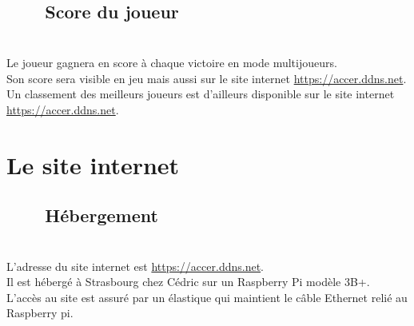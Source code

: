 \documentclass[titlepage, 13px, a4paper]{report}
\begin{document}
\subsection[Score du joueur]{~~~~Score du joueur}
\paragraph*{} \hspace{0pt} \\
Le joueur gagnera en score à chaque victoire en mode multijoueurs. \\
Son score sera visible en jeu mais aussi sur le site internet \url{https://accer.ddns.net}. \\
Un classement des meilleurs joueurs est d’ailleurs disponible sur le site internet \url{https://accer.ddns.net}. \\


\newpage

\section{Le site internet}
\subsection[Hébergement]{~~~~Hébergement}
\paragraph*{} \hspace{0pt} \\
L'adresse du site internet est \url{https://accer.ddns.net}. \\
Il est hébergé à Strasbourg chez Cédric sur un Raspberry Pi modèle 3B+. \\
L’accès au site est assuré par un élastique qui maintient le câble Ethernet relié au Raspberry pi. \\
\end{document}
